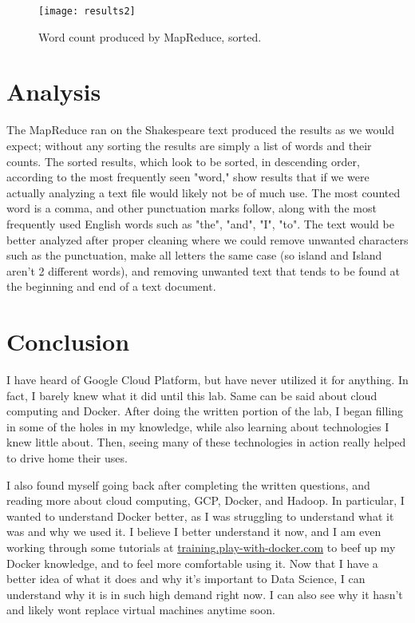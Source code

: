 \documentclass[]{article}
\begin{document}
\begin{figure}[!h]
	\texttt{[image: results2]}
	\caption{Word count produced by MapReduce, sorted.}
	\label{Fig:Race}
\end{figure}

\section{Analysis}
The MapReduce ran on the Shakespeare text produced the results as we would expect; without any sorting the results are simply a list of words and their counts.  The sorted results, which look to be sorted, in descending order, according to the most frequently seen "word," show results that if we were actually analyzing a text file would likely not be of much use.  The most counted word is a comma, and other punctuation marks follow, along with the most frequently used English words such as "the", "and", "I", "to".  The text would be better analyzed after proper cleaning where we could remove unwanted characters such as the punctuation, make all letters the same case (so island and Island aren't 2 different words), and removing unwanted text that tends to be found at the beginning and end of a text document.  
\section{Conclusion}
I have heard of Google Cloud Platform, but have never utilized it for anything.  In fact, I barely knew what it did until this lab.  Same can be said about cloud computing and Docker.  After doing the written portion of the lab, I began filling in some of the holes in my knowledge, while also learning about technologies I knew little about.  Then, seeing many of these technologies in action really helped to drive home their uses. 

I also found myself going back after completing the written questions, and reading more about cloud computing, GCP, Docker, and Hadoop.  In particular, I wanted to understand Docker better, as I was struggling to understand what it was and why we used it.  I believe I better understand it now, and I am even working through some tutorials at \url{training.play-with-docker.com} to beef up my Docker knowledge, and to feel more comfortable using it.  Now that I have a better idea of what it does and why it's important to Data Science, I can understand why it is in such high demand right now.  I can also see why it hasn't and likely wont replace virtual machines anytime soon.
\end{document}
